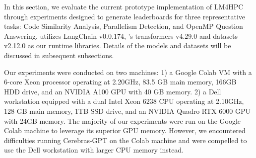 In this section, we evaluate the current prototype implementation of LM4HPC through experiments designed to generate leaderboards for three representative tasks: Code Similarity Analysis, Parallelism Detection, and OpenMP Question Answering. \ourwork utilizes LangChain v0.0.174, \face's transformers v4.29.0 and datasets v2.12.0 as our runtime libraries. 
Details of the models and datasets will be discussed in subsequent subsections.

Our experiments were conducted on two machines: 1) a Google Colab VM with a 6-core Xeon processor operating at 2.20GHz, 83.5 GB main memory, 166GB HDD drive, and an NVIDIA A100 GPU with 40 GB memory. 2) a Dell workstation equipped with a dual Intel Xeon 6238 CPU operating at 2.10GHz, 128 GB main memory, 1TB SSD drive, and an NVIDIA Quadro RTX 6000 GPU with 24GB memory.  The majority of our experiments were run on the Google Colab machine to leverage its superior GPU memory. However, we encountered difficulties running Cerebras-GPT on the Colab machine and were compelled to use the Dell workstation with larger CPU memory instead. 
 




